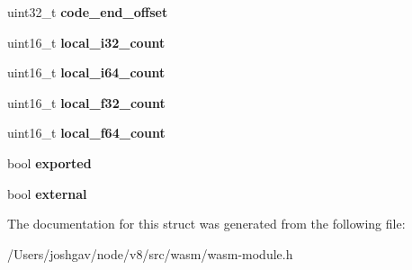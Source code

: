 \begin{DoxyCompactItemize}
\item 
uint32\+\_\+t {\bfseries code\+\_\+end\+\_\+offset}\hypertarget{structv8_1_1internal_1_1wasm_1_1_wasm_function_a796cec64f5fc2f6a2a74d4e9ab097d6f}{}\label{structv8_1_1internal_1_1wasm_1_1_wasm_function_a796cec64f5fc2f6a2a74d4e9ab097d6f}

\item 
uint16\+\_\+t {\bfseries local\+\_\+i32\+\_\+count}\hypertarget{structv8_1_1internal_1_1wasm_1_1_wasm_function_a0b5724cdab8469fd8aa524dd56cc3f74}{}\label{structv8_1_1internal_1_1wasm_1_1_wasm_function_a0b5724cdab8469fd8aa524dd56cc3f74}

\item 
uint16\+\_\+t {\bfseries local\+\_\+i64\+\_\+count}\hypertarget{structv8_1_1internal_1_1wasm_1_1_wasm_function_a95f5337c3929ae253f241e0718cb3b9d}{}\label{structv8_1_1internal_1_1wasm_1_1_wasm_function_a95f5337c3929ae253f241e0718cb3b9d}

\item 
uint16\+\_\+t {\bfseries local\+\_\+f32\+\_\+count}\hypertarget{structv8_1_1internal_1_1wasm_1_1_wasm_function_aab92ca97e3b8372b3a0998468992333c}{}\label{structv8_1_1internal_1_1wasm_1_1_wasm_function_aab92ca97e3b8372b3a0998468992333c}

\item 
uint16\+\_\+t {\bfseries local\+\_\+f64\+\_\+count}\hypertarget{structv8_1_1internal_1_1wasm_1_1_wasm_function_ae1bb0a5ffe57f4b64c6decb6c5342b4c}{}\label{structv8_1_1internal_1_1wasm_1_1_wasm_function_ae1bb0a5ffe57f4b64c6decb6c5342b4c}

\item 
bool {\bfseries exported}\hypertarget{structv8_1_1internal_1_1wasm_1_1_wasm_function_a14e027b8538f33fdc86797af1c069334}{}\label{structv8_1_1internal_1_1wasm_1_1_wasm_function_a14e027b8538f33fdc86797af1c069334}

\item 
bool {\bfseries external}\hypertarget{structv8_1_1internal_1_1wasm_1_1_wasm_function_abc7fba210a0f70852df22761c423b886}{}\label{structv8_1_1internal_1_1wasm_1_1_wasm_function_abc7fba210a0f70852df22761c423b886}

\end{DoxyCompactItemize}


The documentation for this struct was generated from the following file\+:\begin{DoxyCompactItemize}
\item 
/\+Users/joshgav/node/v8/src/wasm/wasm-\/module.\+h\end{DoxyCompactItemize}

